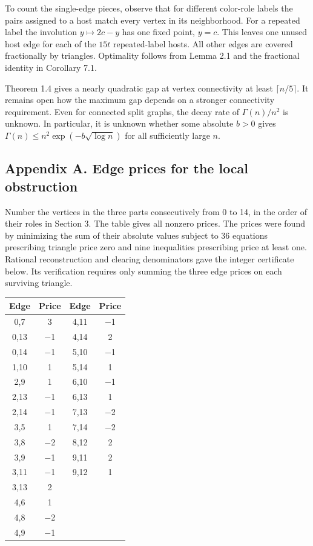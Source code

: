 \documentclass[english,11pt,a4paper]{article}
\begin{document}
To count the single-edge pieces, observe that for different color-role labels the pairs assigned to a host match every vertex in its neighborhood. For a repeated label the involution \(y\mapsto2c-y\) has one fixed point, \(y=c\). This leaves one unused host edge for each of the \(15t\) repeated-label hosts. All other edges are covered fractionally by triangles. Optimality follows from Lemma 2.1 and the fractional identity in Corollary 7.1.

Theorem 1.4 gives a nearly quadratic gap at vertex connectivity at least \(\lceil n/5\rceil\). It remains open how the maximum gap depends on a stronger connectivity requirement. Even for connected split graphs, the decay rate of \(\Gamma(n)/n^2\) is unknown. In particular, it is unknown whether some absolute \(b>0\) gives \(\Gamma(n)\le n^2\exp(-b\sqrt{\log n})\) for all sufficiently large \(n\).

\subsection{Appendix A. Edge prices for the local obstruction}\label{appendix-a.-edge-prices-for-the-local-obstruction}

Number the vertices in the three parts consecutively from 0 to 14, in the order of their roles in Section 3. The table gives all nonzero prices. The prices were found by minimizing the sum of their absolute values subject to 36 equations prescribing triangle price zero and nine inequalities prescribing price at least one. Rational reconstruction and clearing denominators gave the integer certificate below. Its verification requires only summing the three edge prices on each surviving triangle.

\begin{center}
\begin{tabular}{cccc}
\toprule
Edge & Price & Edge & Price \\
\midrule
0,7 & 3 & 4,11 & $-$1 \\
0,13 & $-$1 & 4,14 & 2 \\
0,14 & $-$1 & 5,10 & $-$1 \\
1,10 & 1 & 5,14 & 1 \\
2,9 & 1 & 6,10 & $-$1 \\
2,13 & $-$1 & 6,13 & 1 \\
2,14 & $-$1 & 7,13 & $-$2 \\
3,5 & 1 & 7,14 & $-$2 \\
3,8 & $-$2 & 8,12 & 2 \\
3,9 & $-$1 & 9,11 & 2 \\
3,11 & $-$1 & 9,12 & 1 \\
3,13 & 2 &  &  \\
4,6 & 1 &  &  \\
4,8 & $-$2 &  &  \\
4,9 & $-$1 &  &  \\
\bottomrule
\end{tabular}
\end{center}
\end{document}
